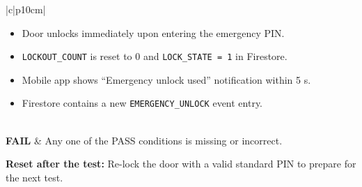 \begin{samepage}
\begin{center}
\begin{tabular}{|c|p{10cm}|}
\begin{minipage}[t]{\linewidth}
\begin{itemize}
          \item Door unlocks immediately upon entering the emergency PIN.
          \item \texttt{LOCKOUT\_COUNT} is reset to 0 and \texttt{LOCK\_STATE = 1} in Firestore.
          \item Mobile app shows “Emergency unlock used” notification within 5 s.
          \item Firestore contains a new \texttt{EMERGENCY\_UNLOCK} event entry. \\
        \end{itemize}
        \end{minipage} \\
      \hline
      \textbf{FAIL} & Any one of the PASS conditions is missing or incorrect. \\
      \hline
    \end{tabular}
    \end{center}
    
    \vspace{0.5em}
    
    \noindent\textbf{Reset after the test:}  
    Re-lock the door with a valid standard PIN to prepare for the next test.\\
    
\end{samepage}



